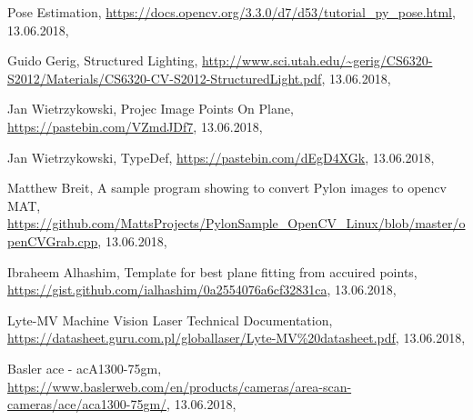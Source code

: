 \documentclass[conference]{IEEEtran}
\begin{document}
\begin{thebibliography}{00}
Pose Estimation, \url{https://docs.opencv.org/3.3.0/d7/d53/tutorial_py_pose.html}, 13.06.2018,

Guido Gerig,
Structured Lighting, 
\url{http://www.sci.utah.edu/~gerig/CS6320-S2012/Materials/CS6320-CV-S2012-StructuredLight.pdf}, 13.06.2018,

Jan Wietrzykowski,
Projec Image Points On Plane, 
\url{https://pastebin.com/VZmdJDf7}, 13.06.2018,

Jan Wietrzykowski,
TypeDef, 
\url{https://pastebin.com/dEgD4XGk}, 13.06.2018,

Matthew Breit,
A sample program showing to convert Pylon images to opencv MAT, 
\url{https://github.com/MattsProjects/PylonSample_OpenCV_Linux/blob/master/openCVGrab.cpp}, 13.06.2018,

Ibraheem Alhashim,
Template for best plane fitting from accuired points, 
\url{https://gist.github.com/ialhashim/0a2554076a6cf32831ca}, 13.06.2018,

Lyte-MV Machine Vision Laser Technical Documentation, 
\url{https://datasheet.guru.com.pl/globallaser/Lyte-MV\%20datasheet.pdf}, 13.06.2018,

Basler ace - acA1300-75gm, 
\url{https://www.baslerweb.com/en/products/cameras/area-scan-cameras/ace/aca1300-75gm/}, 13.06.2018,

\end{thebibliography}
\end{document}
